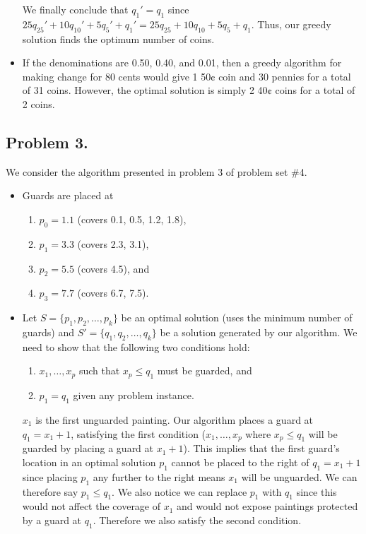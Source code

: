 \documentclass[11pt, letterpaper, titlepage]{article}
\begin{document}
\begin{itemize}
    We finally conclude that $q_{1}' = q_{1}$ since $25q_{25}' + 10q_{10}' + 5q_{5}' + q_{1}' = 25q_{25} + 10q_{10} + 5q_{5} + q_{1}$. Thus, our greedy solution finds the optimum number of coins.
    
    \item If the denominations are 0.50, 0.40, and 0.01, then a greedy algorithm for making change for 80 cents would give 1 50¢ coin and 30 pennies for a total of 31 coins. However, the optimal solution is simply 2 40¢ coins for a total of 2 coins.
\end{itemize}

\newpage

\subsection*{Problem 3.}
We consider the algorithm presented in problem 3 of problem set \#4.
\begin{itemize}
    \item Guards are placed at
    \begin{enumerate}
        \item $p_0 = 1.1$ (covers 0.1, 0.5, 1.2, 1.8),
        \item $p_1 = 3.3$ (covers 2.3, 3.1),
        \item $p_2 = 5.5$ (covers 4.5), and
        \item $p_3 = 7.7$ (covers 6.7, 7.5).
    \end{enumerate}

    \item Let $S = \{ p_1, p_2, \ldots, p_k \}$ be an optimal solution (uses the minimum number of guards) and $S' = \{ q_1, q_2, \ldots, q_k \}$ be a solution generated by our algorithm. We need to show that the following two conditions hold:
    \begin{enumerate}
        \item $x_1, \ldots, x_p$ such that $x_p \leq q_1$ must be guarded, and
        \item $p_1 = q_1$ given any problem instance.
    \end{enumerate}
    $x_1$ is the first unguarded painting. Our algorithm places a guard at $q_1 = x_1 + 1$, satisfying the first condition ($x_1, \ldots, x_p$ where $x_p \leq q_1$ will be guarded by placing a guard at $x_1 + 1$). This implies that the first guard's location in an optimal solution $p_1$ cannot be placed to the right of $q_1 = x_1 + 1$ since placing $p_1$ any further to the right means $x_1$ will be unguarded. We can therefore say $p_1 \leq q_1$. We also notice we can replace $p_1$ with $q_1$ since this would not affect the coverage of $x_1$ and would not expose paintings protected by a guard at $q_1$. Therefore we also satisfy the second condition.
\end{itemize}
\end{document}
